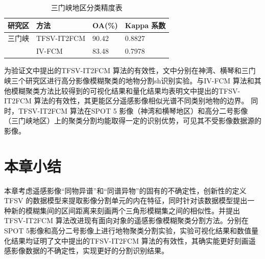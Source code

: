 \begin{table}[htbp]
    \caption{三门峡地区分类精度表}\label{tab:sanmenxia_oa}
    \centering
    \begin{tabular}{llll}
        \toprule
        研究区 & 方法        & OA(\%) & Kappa 系数 \\
        \midrule
        三门峡 & TFSV-IT2FCM & 90.42  & 0.8827     \\
               & IV-FCM      & 83.48  & 0.7978     \\
        \bottomrule
    \end{tabular}
\end{table}

为验证文中提出的TFSV-IT2FCM 算法的有效性，文中分别在神湾、横琴和三门峡三个研究区进行高分影像模糊聚类的地物分割sh识别实验。与IV-FCM 算法和其他模糊聚类方法比较得到的可视化结果和量化结果均表明文中提出的TFSV-IT2FCM 算法的有效性，其更能区分遥感影像相似光谱不同类别地物的边界。 同时，TFSV-IT2FCM 算法在SPOT 5 影像（神湾和横琴地区）和高分二号影像（三门峡地区）上的聚类分割均能取得一定的识别优势，可见其不受影像数据源的影像。

\section{本章小结}
\label{sec::chap03-5}
本章考虑遥感影像“同物异谱”和“同谱异物”的固有的不确定性，创新性的定义TFSV 的数据模型来提取影像分割单元的内在特征，同时针对该数据模型提出一种新的模糊集间的区间距离来刻画两个三角形模糊集之间的相似性。并提出TFSV-IT2FCM 算法改进现有面向对象的遥感影像模糊聚类分割方法。分别在SPOT 5影像和高分二号影像上进行地物聚类分割实验，实验可视化结果和数值量化结果均证明了文中提出的TFSV-IT2FCM 算法的有效性，其确实能更好刻画遥感影像数据的不确定性，实现更好的分割识别结果。
